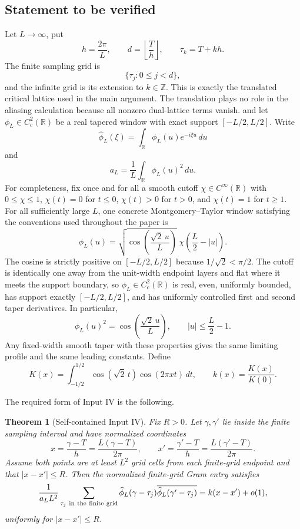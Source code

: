\documentclass[11pt]{article}
\newtheorem{theorem}{Theorem}[section]
\newcommand{\R}{\mathbb R}
\begin{document}
\subsection{Statement to be verified}

Let $L\to\infty$, put
\[
 h=\frac{2\pi}{L},\qquad
 d=\left\lfloor\frac{T}{h}\right\rfloor,\qquad
 \tau_k=T+kh.
\]
The finite sampling grid is
\[
 \{\tau_j:0\le j<d\},
\]
and the infinite grid is its extension to $k\in\mathbb Z$.  This is exactly
the translated critical lattice used in the main argument.  The translation
plays no role in the aliasing calculation because all nonzero dual-lattice
terms vanish.
and let $\phi_L\in C_c^2(\mathbb R)$ be a real tapered window with exact support
$[-L/2,L/2]$.  Write
\[
 \widehat\phi_L(\xi)=\int_{\R}\phi_L(u)e^{-i\xi u}\,du
\]
and
\[
 a_L=\frac1L\int_{\R}\phi_L(u)^2\,du.
\]
For completeness, fix once and for all a smooth cutoff
$\chi\in C^\infty(\mathbb R)$ with
$0\le\chi\le1$, $\chi(t)=0$ for $t\le0$,
$\chi(t)>0$ for $t>0$, and $\chi(t)=1$ for $t\ge1$.  For all sufficiently large $L$, one concrete
Montgomery--Taylor window satisfying the conventions used throughout the paper
is
\[
 \phi_L(u)=
 \sqrt{\cos\!\left(\frac{\sqrt2\,u}{L}\right)}
 \;\chi\!\left(\frac L2-|u|\right).
\]
The cosine is strictly positive on $[-L/2,L/2]$ because
$1/\sqrt2<\pi/2$.  The cutoff is identically one away from the unit-width
endpoint layers and flat where it meets the support boundary, so
$\phi_L\in C_c^2(\mathbb R)$ is real, even, uniformly bounded, has support
exactly $[-L/2,L/2]$, and has uniformly controlled first and second taper
derivatives.  In particular,
\[
 \phi_L(u)^2=\cos\!\left(\frac{\sqrt2\,u}{L}\right),
 \qquad |u|\le \frac L2-1.
\]
Any fixed-width smooth taper with these properties gives the same limiting
profile and the same leading constants.
Define
\[
 K(x)=\int_{-1/2}^{1/2}\cos(\sqrt2\,t)\cos(2\pi xt)\,dt,
 \qquad k(x)=\frac{K(x)}{K(0)}.
\]

The required form of Input IV is the following.

\begin{theorem}[Self-contained Input IV]\label{aiv:thm:IV}
Fix $R>0$.  Let $\gamma,\gamma'$ lie inside the finite sampling interval
and have normalized coordinates
\[
 x=\frac{\gamma-T}{h}
   =\frac{L(\gamma-T)}{2\pi},
 \qquad
 x'=\frac{\gamma'-T}{h}
   =\frac{L(\gamma'-T)}{2\pi}.
\]
Assume both points are at least $L^2$ grid cells from each finite-grid
endpoint and that $|x-x'|\le R$.  Then the normalized finite-grid Gram entry satisfies
\[
 \frac{1}{a_LL^2}
 \sum_{\tau_j\ {\rm in\ the\ finite\ grid}}
 \widehat\phi_L(\gamma-\tau_j)
 \overline{\widehat\phi_L(\gamma'-\tau_j)}
 =
 k(x-x')+o(1),
\]
uniformly for $|x-x'|\le R$.
\end{theorem}
\end{document}
